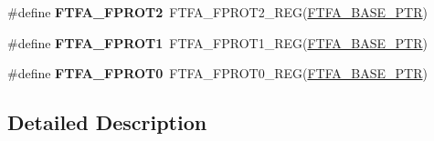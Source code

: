 \begin{DoxyCompactItemize}
\item 
\hypertarget{group___f_t_f_a___register___accessor___macros_ga25a0859e528311bedda3719d80e44a59}{}\#define {\bfseries F\+T\+F\+A\+\_\+\+F\+P\+R\+O\+T2}~F\+T\+F\+A\+\_\+\+F\+P\+R\+O\+T2\+\_\+\+R\+E\+G(\hyperlink{group___f_t_f_a___peripheral_ga13ad52f12d5b04e5e01f69ab18ed9216}{F\+T\+F\+A\+\_\+\+B\+A\+S\+E\+\_\+\+P\+T\+R})\label{group___f_t_f_a___register___accessor___macros_ga25a0859e528311bedda3719d80e44a59}

\item 
\hypertarget{group___f_t_f_a___register___accessor___macros_ga6fa22ad27ded5b2e13a5b6dd22d6641d}{}\#define {\bfseries F\+T\+F\+A\+\_\+\+F\+P\+R\+O\+T1}~F\+T\+F\+A\+\_\+\+F\+P\+R\+O\+T1\+\_\+\+R\+E\+G(\hyperlink{group___f_t_f_a___peripheral_ga13ad52f12d5b04e5e01f69ab18ed9216}{F\+T\+F\+A\+\_\+\+B\+A\+S\+E\+\_\+\+P\+T\+R})\label{group___f_t_f_a___register___accessor___macros_ga6fa22ad27ded5b2e13a5b6dd22d6641d}

\item 
\hypertarget{group___f_t_f_a___register___accessor___macros_gad1a0d6a372aec4a0f1b41e9f8d45f59b}{}\#define {\bfseries F\+T\+F\+A\+\_\+\+F\+P\+R\+O\+T0}~F\+T\+F\+A\+\_\+\+F\+P\+R\+O\+T0\+\_\+\+R\+E\+G(\hyperlink{group___f_t_f_a___peripheral_ga13ad52f12d5b04e5e01f69ab18ed9216}{F\+T\+F\+A\+\_\+\+B\+A\+S\+E\+\_\+\+P\+T\+R})\label{group___f_t_f_a___register___accessor___macros_gad1a0d6a372aec4a0f1b41e9f8d45f59b}

\end{DoxyCompactItemize}


\subsection{Detailed Description}
